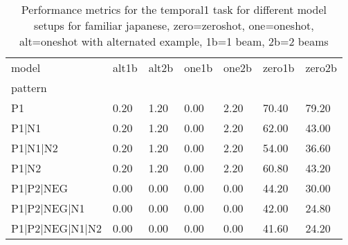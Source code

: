 \begin{table}[h]
\begin{tabular}{l|llllll}
\toprule
model & alt1b & alt2b & one1b & one2b & zero1b & zero2b \\
pattern &  &  &  &  &  &  \\
\midrule
P1 & 0.20 & 1.20 & 0.00 & 2.20 & 70.40 & 79.20 \\
P1|N1 & 0.20 & 1.20 & 0.00 & 2.20 & 62.00 & 43.00 \\
P1|N1|N2 & 0.20 & 1.20 & 0.00 & 2.20 & 54.00 & 36.60 \\
P1|N2 & 0.20 & 1.20 & 0.00 & 2.20 & 60.80 & 43.20 \\
P1|P2|NEG & 0.00 & 0.00 & 0.00 & 0.00 & 44.20 & 30.00 \\
P1|P2|NEG|N1 & 0.00 & 0.00 & 0.00 & 0.00 & 42.00 & 24.80 \\
P1|P2|NEG|N1|N2 & 0.00 & 0.00 & 0.00 & 0.00 & 41.60 & 24.20 \\
\bottomrule
\end{tabular}
\caption{Performance metrics for the temporal1 task for different model setups for familiar japanese, zero=zeroshot, one=oneshot, alt=oneshot with alternated example, 1b=1 beam, 2b=2 beams}
\label{tab:ja fam_temporal1_performance}
\end{table}
